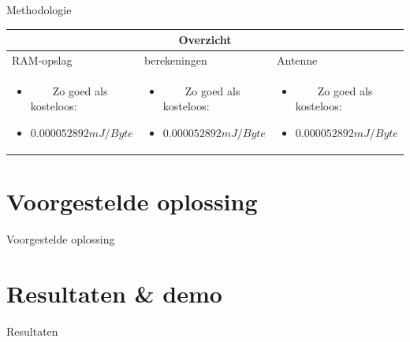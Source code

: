\documentclass[presentation, bigger]{beamer}
\newcommand{\tabitem}{~~\llap{\textbullet}~~}
\begin{document}
\begin{frame}{Methodologie}
     \begin{tabular}{ p{}  p{} p{}}
     \toprule
     & \multicolumn{1}{c}{Overzicht}  & \\ 
      \toprule
      RAM-opslag & berekeningen & Antenne\\
    \cmidrule(r){1-1}\cmidrule(lr){2-2}\cmidrule(l){3-3}
	\begin{itemize}
	\item \tabitem Zo goed als kosteloos:
    \item $0.000052892mJ/Byte$  
    \end{itemize}
    & 
    	\begin{itemize}
	\item \tabitem Zo goed als kosteloos:
    \item $0.000052892mJ/Byte$  
    \end{itemize}
    & 
    	\begin{itemize}
	\item \tabitem Zo goed als kosteloos:
    \item $0.000052892mJ/Byte$  
    \end{itemize}
     \\
     \end{tabular}
\end{frame}
\section{Voorgestelde oplossing}

\begin{frame}{Voorgestelde oplossing}
\end{frame}

\section{Resultaten \& demo}
\begin{frame}{Resultaten}

\end{frame}
\end{document}

